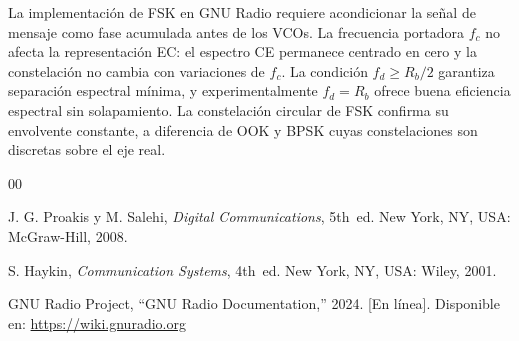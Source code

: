 \documentclass[conference]{IEEEtran}
\begin{document}
La implementación de FSK en GNU Radio requiere acondicionar la señal de mensaje 
como fase acumulada antes de los VCOs. La frecuencia portadora $f_c$ no afecta 
la representación EC: el espectro CE permanece centrado en cero y la constelación 
no cambia con variaciones de $f_c$. La condición $f_d \geq R_b/2$ garantiza 
separación espectral mínima, y experimentalmente $f_d = R_b$ ofrece buena 
eficiencia espectral sin solapamiento. La constelación circular de FSK confirma 
su envolvente constante, a diferencia de OOK y BPSK cuyas constelaciones son 
discretas sobre el eje real.


\begin{thebibliography}{00}

J. G. Proakis y M. Salehi, \textit{Digital Communications}, 5th~ed.
New York, NY, USA: McGraw-Hill, 2008.

S. Haykin, \textit{Communication Systems}, 4th~ed.
New York, NY, USA: Wiley, 2001.

GNU Radio Project, ``GNU Radio Documentation,'' 2024. [En línea].
Disponible en: \url{https://wiki.gnuradio.org}

\end{thebibliography}
\end{document}
